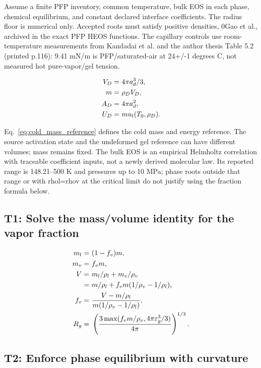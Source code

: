 \documentclass[11pt]{article}
\begin{document}
Assume a finite PFP inventory, common temperature, bulk EOS in each phase, chemical equilibrium, and constant declared interface coefficients. The radius floor is numerical only. Accepted roots must satisfy positive densities, 0Gao et al., archived in the exact PFP HEOS functions. The capillary controls use room-temperature measurements from Kandadai et al. and the author thesis Table 5.2 (printed p.116): 9.41 mN/m is PFP/saturated-air at 24+/-1  degrees C, not measured hot pure-vapor/gel tension.

\begin{align}
V_D= & ~4\pi a_d^3/3, \notag \\
m= & ~\rho_D V_D, \notag \\
A_D= & ~4\pi a_d^2, \notag \\
U_D= & ~m u_l(T_0,\rho_D). \label{eq:cold_mass_reference}
\end{align}

Eq.~\eqref{eq:cold_mass_reference} defines the cold mass and energy reference. The source activation state and the undeformed gel reference can have different volumes; mass remains fixed. The bulk EOS is an empirical Helmholtz correlation with traceable coefficient inputs, not a newly derived molecular law. Its reported range is 148.21--500 K and pressures up to 10 MPa; phase roots outside that range or with rhol=rhov at the critical limit do not justify using the fraction formula below.

\subsection{T1: Solve the mass/volume identity for the vapor fraction}

\begin{align}
m_l= & ~(1-f_v)m, \notag \\
m_v= & ~f_vm, \notag \\
V= & ~m_l/\rho_l+m_v/\rho_v \notag \\
= & ~m/\rho_l+f_vm(1/\rho_v-1/\rho_l), \notag \\
f_v= & ~\frac{V-m/\rho_l}{m(1/\rho_v-1/\rho_l)}, \notag \\
R_g= & ~\left(\frac{3\max(f_vm/\rho_v,4\pi\varepsilon_g^3/3)}{4\pi}\right)^{1/3}. \label{eq:finite_mass_fraction}
\end{align}

\subsection{T2: Enforce phase equilibrium with curvature}
\end{document}
